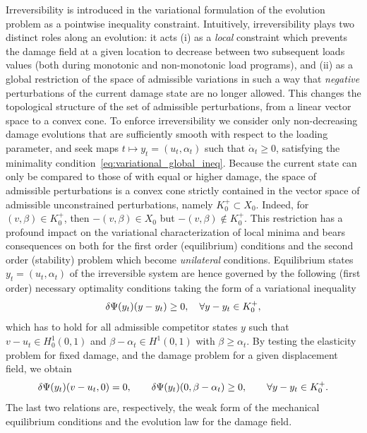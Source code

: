 \documentclass[10pt]{article}
\begin{document}
Irreversibility is introduced in the variational formulation of the evolution problem as a pointwise inequality constraint. Intuitively, irreversibility plays two distinct roles along an evolution: it acts (i) as a \emph{local} constraint which prevents the damage field at a given location to decrease between two subsequent loads values (both during monotonic and non-monotonic load programs), and (ii) as a global restriction of the space of admissible variations in such a way that \emph{negative} perturbations of the current damage state are no longer allowed. This changes the topological structure of the set of admissible perturbations, from a linear vector space to a convex cone.
To enforce irreversibility we consider only non-decreasing damage evolutions that are sufficiently smooth with respect to the loading parameter, and seek maps $t\mapsto y_t = (u_t, \alpha_t)$ such that $\dot \alpha_t \geq 0$,  satisfying the minimality condition~\eqref{eq:variational_global_ineq}.
Because the current state can only be compared to those of with equal or higher damage, the space of admissible perturbations is a  convex cone strictly contained in the vector space of admissible unconstrained perturbations, namely $K^+_0\subset X_0$. Indeed, for $(v, \beta)\in K^+_0$, then $-(v, \beta) \in X_0$ but $-(v, \beta)\notin K^+_0$. This restriction has a profound impact on the variational characterization of local minima and bears consequences on both for the first order (equilibrium) conditions and the second order (stability) problem which become \emph{unilateral} conditions.
%
Equilibrium states $y_t=(u_t, \alpha_t)$ of the irreversible system are hence governed by the following (first order) necessary optimality conditions taking the form of a variational inequality
\begin{equation}
    \label{eq:eq_variational_inequality_full}
    \delta \Psi(y_t)(y-y_t) \geq 0, \quad \forall y-y_t \in K^+_0,
\end{equation}
%
which has to hold for all admissible competitor states $y$ such that $v-u_t \in H^1_0(0, 1)$ and $\beta-\alpha_t\in H^1(0,1)$ with $\beta \geq \alpha_t$.
By testing the elasticity problem for fixed damage, and the damage problem for a given displacement field, we obtain
\begin{equation}
    \label{eq:variational_equilibrium}
    \delta \Psi(y_t)(v-u_t, 0) = 0, \qquad \delta \Psi(y_t)(0, \beta-\alpha_t) \geq 0, \qquad \forall y-y_t \in K^+_{0}.
\end{equation}
The last two relations are, respectively, the weak form of the mechanical equilibrium conditions and the  evolution law  for the damage field.
\end{document}
